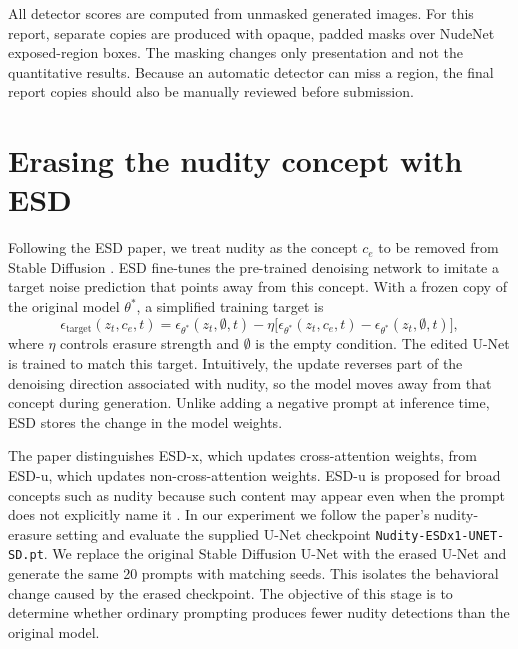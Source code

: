 \documentclass[11pt,a4paper]{article}
\begin{document}
All detector scores are computed from unmasked generated images. For this report, separate copies are produced with opaque, padded masks over NudeNet exposed-region boxes. The masking changes only presentation and not the quantitative results. Because an automatic detector can miss a region, the final report copies should also be manually reviewed before submission.

\section{Erasing the nudity concept with ESD}
Following the ESD paper, we treat nudity as the concept $c_e$ to be removed from Stable Diffusion \cite{esd}. ESD fine-tunes the pre-trained denoising network to imitate a target noise prediction that points away from this concept. With a frozen copy of the original model $\theta^*$, a simplified training target is
\begin{equation}
\epsilon_{\mathrm{target}}(z_t,c_e,t)
=\epsilon_{\theta^*}(z_t,\emptyset,t)
-\eta\bigl[\epsilon_{\theta^*}(z_t,c_e,t)
-\epsilon_{\theta^*}(z_t,\emptyset,t)\bigr],
\label{eq:esd}
\end{equation}
where $\eta$ controls erasure strength and $\emptyset$ is the empty condition. The edited U-Net is trained to match this target. Intuitively, the update reverses part of the denoising direction associated with nudity, so the model moves away from that concept during generation. Unlike adding a negative prompt at inference time, ESD stores the change in the model weights.

The paper distinguishes ESD-x, which updates cross-attention weights, from ESD-u, which updates non-cross-attention weights. ESD-u is proposed for broad concepts such as nudity because such content may appear even when the prompt does not explicitly name it \cite{esd}. In our experiment we follow the paper's nudity-erasure setting and evaluate the supplied U-Net checkpoint \texttt{Nudity-ESDx1-UNET-SD.pt}. We replace the original Stable Diffusion U-Net with the erased U-Net and generate the same 20 prompts with matching seeds. This isolates the behavioral change caused by the erased checkpoint. The objective of this stage is to determine whether ordinary prompting produces fewer nudity detections than the original model.
\end{document}
